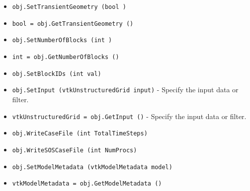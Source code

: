 \begin{itemize}
\item  \verb|obj.SetTransientGeometry (bool )|

\item  \verb|bool = obj.GetTransientGeometry ()|

\item  \verb|obj.SetNumberOfBlocks (int )|

\item  \verb|int = obj.GetNumberOfBlocks ()|

\item  \verb|obj.SetBlockIDs (int val)|

\item  \verb|obj.SetInput (vtkUnstructuredGrid input)| -  Specify the input data or filter.

\item  \verb|vtkUnstructuredGrid = obj.GetInput ()| -  Specify the input data or filter.

\item  \verb|obj.WriteCaseFile (int TotalTimeSteps)|

\item  \verb|obj.WriteSOSCaseFile (int NumProcs)|

\item  \verb|obj.SetModelMetadata (vtkModelMetadata model)|

\item  \verb|vtkModelMetadata = obj.GetModelMetadata ()|

\end{itemize}
